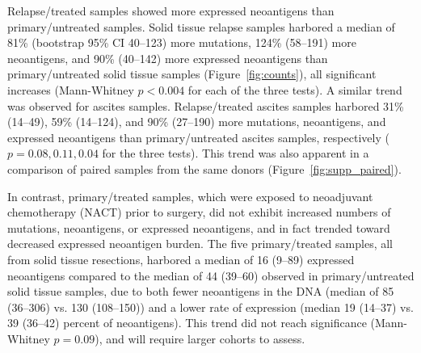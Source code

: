 Relapse/treated samples showed more expressed neoantigens than primary/untreated samples. Solid tissue relapse samples harbored a median of 81\% (bootstrap 95\% CI 40--123) more mutations, 124\% (58--191) more neoantigens, and 90\% (40--142) more expressed neoantigens than primary/untreated solid tissue samples (Figure~\ref{fig:counts}), all significant increases (Mann-Whitney $p < 0.004$ for each of the three tests). A similar trend was observed for ascites samples. Relapse/treated ascites samples harbored 31\% (14--49), 59\% (14--124), and 90\% (27--190) more mutations, neoantigens, and expressed neoantigens than primary/untreated ascites samples, respectively ($p=0.08, 0.11, 0.04$ for the three tests). This trend was also apparent in a comparison of paired samples from the same donors (Figure~\ref{fig:supp_paired}). 

In contrast, primary/treated samples, which were exposed to neoadjuvant chemotherapy (NACT) prior to surgery, did not exhibit increased numbers of mutations, neoantigens, or expressed neoantigens, and in fact trended toward decreased expressed neoantigen burden. The five primary/treated samples, all from solid tissue resections, harbored a median of 16 (9--89) expressed neoantigens compared to the median of 44 (39--60) observed in primary/untreated solid tissue samples, due to both fewer neoantigens in the DNA (median of 85 (36--306) vs. 130 (108--150)) and a lower rate of expression (median 19 (14--37) vs. 39 (36--42) percent of neoantigens). This trend did not reach significance (Mann-Whitney $p=0.09$), and will require larger cohorts to assess.

